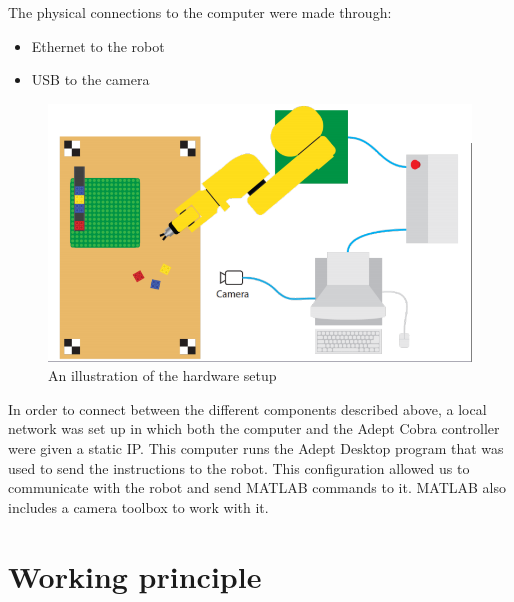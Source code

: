 The physical connections to the computer were made through: 
\begin{itemize}
	\item Ethernet to the robot  
	\item USB to the camera 
\end{itemize}

\begin{figure}[H]
	\centering
	\includegraphics[scale=0.4]{figures/robotCellDesign.png}
	\caption{An illustration of the hardware setup}
\end{figure}

In order to connect between the different components described above, a local network was set up in which both the computer and the Adept Cobra controller were given a static IP. This computer runs the Adept Desktop program that was used to send the instructions to the robot. This configuration allowed us to communicate with the robot and send MATLAB commands to it. MATLAB also includes a camera toolbox to work with it. 

\section{Working principle}\label{sec:workiing_principle}

